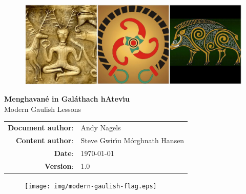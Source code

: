 \begin{titlepage}
  \thispagestyle{empty} %
  \vspace*{\fill}

  \begin{center}
    \begin{figure}[H]
    \centering
    \includegraphics[width=16.0cm]{img/triple-image-banner.eps}
    \end{figure}

    \textbf{\Huge Menghavan\'{e} in Gal\'{a}thach hAtev\'{\i}u}\\
    {\huge Modern Gaulish Lessons}\\
    
    \vspace{\fill}

    \begin{table}[H]
    \begin{center}
    \begin{tabu}{rl}
      \textbf{Document author}: & Andy Nagels\\
      \textbf{Content author}: & Steve Gwir\'{\i}u M\'{o}rghnath Hansen\\
      \textbf{Date}: & \today\\
      \textbf{Version}: & 1.0
    \end{tabu}
    \end{center}
    \label{titlepage_info}
    \end{table}

    \begin{figure}[H]
    \centering
    \texttt{[image: img/modern-gaulish-flag.eps]}
    \end{figure}
  \end{center}
  \vspace*{\fill}

\end{titlepage}
